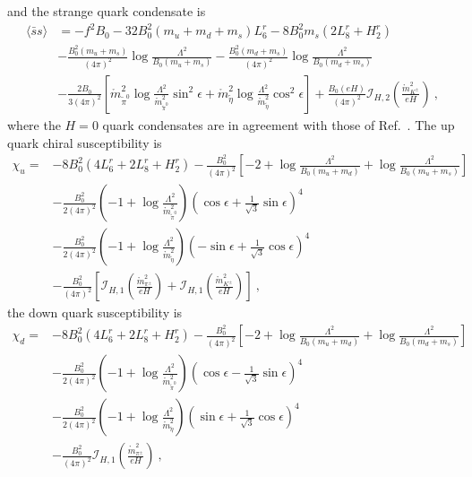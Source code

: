 \documentclass[12pt]{elsarticle}
\begin{document}
and the strange quark condensate is
\begin{equation}
\begin{split}
\label{eq:ss}
\langle\bar{s}s\rangle&=-f^{2}B_{0}-32B_{0}^{2}(m_{u}+m_{d}+m_{s})L^{r}_{6}-8B_{0}^{2}m_{s}(2L^{r}_{8}+H^{r}_{2})\\
&-\frac{B_{0}^{2}(m_{u}+m_{s})}{(4\pi)^{2}}\log\frac{\Lambda^{2}}{B_{0}(m_{u}+m_{s})}-\frac{B_{0}^{2}(m_{d}+m_{s})}{(4\pi)^{2}}\log\frac{\Lambda^{2}}{B_{0}(m_{d}+m_{s})}\\
&-\frac{2B_{0}}{3(4\pi)^{2}}\left[\mathring{m}_{\tilde{\pi}^{0}}^{2}\log\frac{\Lambda^{2}}{\mathring{m}_{\tilde{\pi}^{0}}^{2}}\sin^{2}\epsilon+\mathring{m}_{\tilde{\eta}}^{2}\log\frac{\Lambda^{2}}{\mathring{m}_{\tilde{\eta}}^{2}}\cos^{2}\epsilon\right]+\frac{B_{0}(eH)}{(4\pi)^{2}}\mathcal{I}_{H,2}(\tfrac{\mathring{m}_{K^{\pm}}^{2}}{eH})\ ,
\end{split}
\end{equation}
where the $H=0$ quark condensates are in agreement with those of Ref.~\cite{Gasser:1984gg}. The up quark chiral susceptibility is
\begin{equation}
\begin{split}
\label{eq:chiu}
\chi_{u}=&-8B_{0}^{2}(4L^{r}_{6}+2L^{r}_{8}+H^{r}_{2})-\frac{B_{0}^{2}}{(4\pi)^{2}}\left[-2+\log\frac{\Lambda^{2}}{B_{0}(m_{u}+m_{d})}+\log\frac{\Lambda^{2}}{B_{0}(m_{u}+m_{s})}\right]\\
&-\frac{B_{0}^{2}}{2(4\pi)^{2}}\left(-1+\log\frac{\Lambda^{2}}{\mathring{m}_{\tilde{\pi}^{0}}^{2}}\right)(\cos\epsilon+\tfrac{1}{\sqrt{3}}\sin\epsilon)^{4}\\
&-\frac{B_{0}^{2}}{2(4\pi)^{2}}\left(-1+\log\frac{\Lambda^{2}}{\mathring{m}_{\tilde{\eta}}^{2}}\right)(-\sin\epsilon+\tfrac{1}{\sqrt{3}}\cos\epsilon)^{4}\\
&-\frac{B_{0}^{2}}{(4\pi)^{2}}\left[\mathcal{I}_{H,1}(\tfrac{\mathring{m}^{2}_{\pi^{\pm}}}{eH})+\mathcal{I}_{H,1}(\tfrac{\mathring{m}^{2}_{K^{\pm}}}{eH})\right]\ ,
\end{split}
\end{equation}
the down quark susceptibility is
\begin{equation}
\begin{split}
\label{eq:chid}
\chi_{d}=&-8B_{0}^{2}(4L^{r}_{6}+2L^{r}_{8}+H^{r}_{2})-\frac{B_{0}^{2}}{(4\pi)^{2}}\left[-2+\log\frac{\Lambda^{2}}{B_{0}(m_{u}+m_{d})}+\log\frac{\Lambda^{2}}{B_{0}(m_{d}+m_{s})}\right]\\
&-\frac{B_{0}^{2}}{2(4\pi)^{2}}\left(-1+\log\frac{\Lambda^{2}}{\mathring{m}_{\tilde{\pi}^{0}}^{2}}\right)(\cos\epsilon-\tfrac{1}{\sqrt{3}}\sin\epsilon)^{4}\\
&-\frac{B_{0}^{2}}{2(4\pi)^{2}}\left(-1+\log\frac{\Lambda^{2}}{\mathring{m}_{\tilde{\eta}}^{2}}\right)(\sin\epsilon+\tfrac{1}{\sqrt{3}}\cos\epsilon)^{4}\\
&-\frac{B_{0}^{2}}{(4\pi)^{2}}\mathcal{I}_{H,1}(\tfrac{\mathring{m}^{2}_{\pi^{\pm}}}{eH})\ ,
\end{split}
\end{equation}
\end{document}
